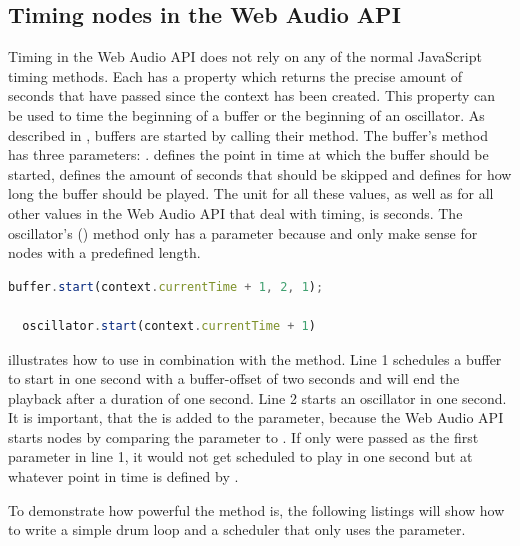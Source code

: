 \subsection{Timing nodes in the Web Audio API}
\label{subsec:timing-in-web-audio}

Timing in the Web Audio API does not rely on any of the normal JavaScript timing methods. Each  has a  property which returns the precise amount of seconds that have passed since the context has been created. This property can be used to time the beginning of a buffer or the beginning of an oscillator. As described in , buffers are started by calling their  method. The buffer's  method has three parameters: .  defines the point in time at which the buffer should be started,  defines the amount of seconds that should be skipped and  defines for how long the buffer should be played. The unit for all these values, as well as for all other values in the Web Audio API that deal with timing, is seconds. The oscillator's ()  method only has a  parameter because  and  only make sense for nodes with a predefined length.

\begin{lstlisting}[language=JavaScript, caption=Usage of the start method's parameters, label=lst:currentTime]
  buffer.start(context.currentTime + 1, 2, 1);

  oscillator.start(context.currentTime + 1)
\end{lstlisting}

 illustrates how to use  in combination with the  method. Line 1 schedules a buffer to start in one second with a buffer-offset of two seconds and will end the playback after a duration of one second. Line 2 starts an oscillator in one second. It is important, that the  is added to the  parameter, because the Web Audio API starts nodes by comparing the  parameter to . If only  were passed as the first parameter in line 1, it would not get scheduled to play in one second but at whatever point in time is defined by .

To demonstrate how powerful the  method is, the following listings will show how to write a simple drum loop and a scheduler that only uses the  parameter.

